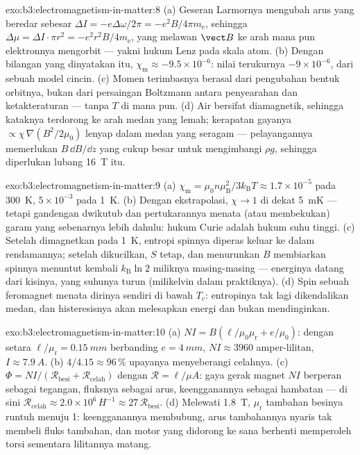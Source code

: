 \begin{solution}{exo:b3:electromagnetism-in-matter:8}
(a) Geseran Larmornya mengubah arus yang beredar sebesar $\Delta I
= -e\Delta\omega/2\pi = -e^2B/4\pi m_{\text{e}}$, sehingga
$\Delta\mu = \Delta I\cdot\pi r^2 = -e^2r^2B/4m_{\text{e}}$,
yang melawan $\vect B$ ke arah mana pun elektronnya mengorbit ---
yakni hukum Lenz pada skala atom. (b) Dengan bilangan yang dinyatakan itu,
$\chi_{\text{m}} \approx -9.5\times10^{-6}$: nilai terukurnya
$-9\times10^{-6}$, dari sebuah model cincin. (c) Momen terimbasnya
berasal dari pengubahan bentuk orbitnya, bukan dari persaingan Boltzmann
antara penyearahan dan ketakteraturan --- tanpa $T$ di mana pun. (d) Air bersifat
diamagnetik, sehingga kataknya terdorong ke arah medan yang lemah; kerapatan
gayanya $\propto \chi\,\nabla(B^2/2\mu_0)$ lenyap dalam medan yang
seragam --- pelayangannya memerlukan $B\,\dd B/\dd z$ yang cukup besar untuk
mengimbangi $\rho g$, sehingga diperlukan lubang \qty{16}{T} itu.
\end{solution}

\begin{solution}{exo:b3:electromagnetism-in-matter:9}
(a) $\chi_{\text{m}} = \mu_0n\mu_{\text{B}}^2/3k_{\text{B}}T
\approx 1.7\times10^{-5}$ pada \qty{300}{K}, $5\times10^{-3}$ pada
\qty{1}{K}. (b) Dengan ekstrapolasi, $\chi \to 1$ di dekat \qty{5}{mK} ---
tetapi gandengan dwikutub dan pertukarannya menata (atau membekukan) garam
yang sebenarnya lebih dahulu: hukum Curie adalah hukum suhu tinggi. (c) Setelah dimagnetkan pada
\qty{1}{K}, entropi spinnya diperas keluar ke dalam rendamannya;
setelah dikucilkan, $S$ tetap, dan menurunkan $B$ membiarkan spinnya menuntut kembali
$k_{\text{B}}\ln 2$ miliknya masing-masing --- energinya datang dari
kisinya, yang suhunya turun (milikelvin dalam praktiknya). (d)
Spin sebuah feromagnet menata dirinya sendiri di bawah $T_{\text{c}}$: entropinya
tak lagi dikendalikan medan, dan histeresisnya akan melesapkan energi dan
bukan mendinginkan.
\end{solution}

\begin{solution}{exo:b3:electromagnetism-in-matter:10}
(a) $NI = B(\ell/\mu_0\mu_{\text{r}} + e/\mu_0)$: dengan
setara $\ell/\mu_{\text{r}} = \qty{0.15}{mm}$ berbanding $e =
\qty{4}{mm}$, $NI \approx 3960$ amper-lilitan, $I \approx
\qty{7.9}{A}$. (b) $4/4.15 \approx 96\,\%$ upayanya menyeberangi
celahnya. (c) $\Phi = NI/(\mathcal R_{\text{besi}} +
\mathcal R_{\text{celah}})$ dengan $\mathcal R = \ell/\mu A$:
gaya gerak magnet $NI$ berperan sebagai tegangan, fluksnya sebagai arus,
keengganannya sebagai hambatan --- di sini $\mathcal R_{\text{celah}}
\approx 2.0\times10^{6}\,\unit{H^{-1}} \approx
27\,\mathcal R_{\text{besi}}$. (d) Melewati \qty{1.8}{T},
$\mu_{\text{r}}$ tambahan besinya runtuh menuju 1: keengganannya
membubung, arus tambahannya nyaris tak membeli fluks tambahan, dan motor
yang didorong ke sana berhenti memperoleh torsi sementara lilitannya matang.
\end{solution}

